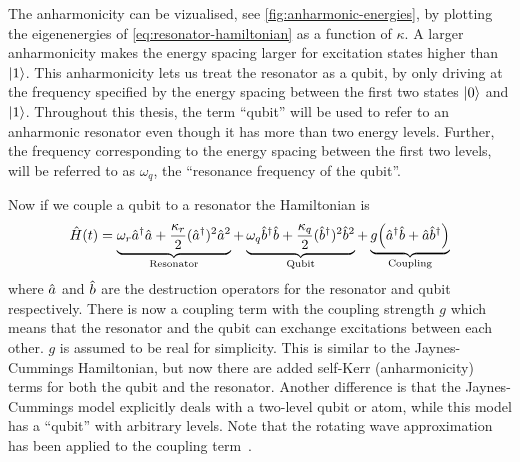 \documentclass[main.tex]{subfiles}
\begin{document}
The anharmonicity can be vizualised, see \cref{fig:anharmonic-energies}, by plotting the eigenenergies of \cref{eq:resonator-hamiltonian} as a function of \( \kappa \).
A larger anharmonicity makes the energy spacing larger for excitation states higher than \(\ket{1}\).
This anharmonicity lets us treat the resonator as a qubit, by only driving at the frequency specified by the energy spacing between the first two states \( \ket{0} \) and \( \ket{1} \).
Throughout this thesis, the term ``qubit'' will be used to refer to an anharmonic resonator even though it has more than two energy levels.
Further, the frequency corresponding to the energy spacing between the first two levels, will be referred to as \( \omega_{q} \), the ``resonance frequency of the qubit''.


Now if we couple a qubit to a resonator the Hamiltonian is
\begin{equation}
    \hat{H}(t) = \underbrace{\omega_{r}\hat{a}^\dagger\hat{a} + \frac{\kappa_r}{2}(\hat{a}^\dagger)^2\hat{a}^2}_{\text{Resonator}} + \underbrace{\omega_{q}\hat{b}^\dagger\hat{b} + \frac{\kappa_q}{2}(\hat{b}^\dagger)^2\hat{b}^2}_{\text{Qubit}} + \underbrace{g\qty(\hat{a}^\dagger\hat{b}+\hat{a}\hat{b}^\dagger)}_{\text{Coupling}}
    \label{eq:hamiltonian-coupled}
\end{equation}
where \( \hat{a} \) and \( \hat{b} \) are the destruction operators for the resonator and qubit respectively.
There is now a coupling term with the coupling strength \(g\) which means that the resonator and the qubit can exchange excitations between each other.
\(g\) is assumed to be real for simplicity.
This is similar to the Jaynes-Cummings Hamiltonian, but now there are added self-Kerr (anharmonicity) terms for both the qubit and the resonator.
Another difference is that the Jaynes-Cummings model explicitly deals with a two-level qubit or atom, while this model has a ``qubit'' with arbitrary levels.
Note that the rotating wave approximation has been applied to the coupling term~\cite{wu_strong-coupling_2007}.
\end{document}
